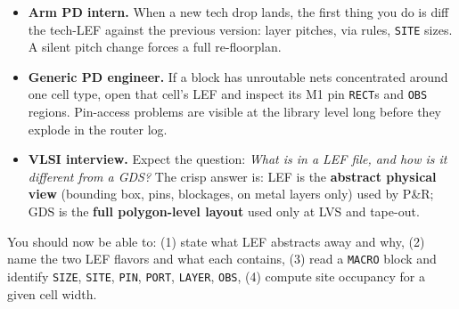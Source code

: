 \begin{pdnote}
\begin{itemize}[leftmargin=*,nosep]
  \item \textbf{Arm PD intern.} When a new tech drop lands, the first thing you do is diff the tech-LEF against the previous version: layer pitches, via rules, \texttt{SITE} sizes. A silent pitch change forces a full re-floorplan.
  \item \textbf{Generic PD engineer.} If a block has unroutable nets concentrated around one cell type, open that cell's LEF and inspect its M1 pin \texttt{RECT}s and \texttt{OBS} regions. Pin-access problems are visible at the library level long before they explode in the router log.
  \item \textbf{VLSI interview.} Expect the question: \emph{What is in a LEF file, and how is it different from a GDS?} The crisp answer is: LEF is the \textbf{abstract physical view} (bounding box, pins, blockages, on metal layers only) used by P\&R; GDS is the \textbf{full polygon-level layout} used only at LVS and tape-out.
\end{itemize}
\end{pdnote}

\begin{checkpoint}
You should now be able to: (1) state what LEF abstracts away and why, (2) name the two LEF flavors and what each contains, (3) read a \texttt{MACRO} block and identify \texttt{SIZE}, \texttt{SITE}, \texttt{PIN}, \texttt{PORT}, \texttt{LAYER}, \texttt{OBS}, (4) compute site occupancy for a given cell width.

\end{checkpoint}
